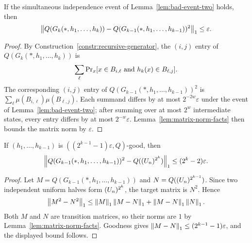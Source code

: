 \begin{lemma}
  \label{lem:induction-matrix-comparison}
  If the simultaneous independence event of Lemma~\ref{lem:bad-event-two}
  holds, then
  \[
    \left\|Q(G_k(*,h_1,\ldots,h_k))
      -Q(G_{k-1}(*,h_1,\ldots,h_{k-1}))^2\right\|_1\le \varepsilon.
  \]
\end{lemma}
\begin{proof}
  By Construction~\ref{constr:recursive-generator}, the $(i,j)$ entry of
  $Q(G_k(*,h_1,\ldots,h_k))$ is
  \[
    \sum_\ell \operatorname{Pr}_x[x\in B_{i,\ell}\text{ and }h_k(x)\in B_{\ell,j}].
  \]
  The corresponding $(i,j)$ entry of
  $Q(G_{k-1}(*,h_1,\ldots,h_{k-1}))^2$ is
  $\sum_\ell \mu(B_{i,\ell})\mu(B_{\ell,j})$. Each summand differs by at most
  $2^{-2w}\varepsilon$ under the event of Lemma~\ref{lem:bad-event-two}; after
  summing over at most $2^w$ intermediate states, every entry differs by at
  most $2^{-w}\varepsilon$. Lemma~\ref{lem:matrix-norm-facts} then bounds the
  matrix norm by $\varepsilon$.
\end{proof}

\begin{lemma}
  \label{lem:induction-square-comparison}
  If $(h_1,\ldots,h_{k-1})$ is
  $((2^{k-1}-1)\varepsilon,Q)$-good, then
  \[
    \left\|Q(G_{k-1}(*,h_1,\ldots,h_{k-1}))^2
      -Q((U_n)^{2^k})\right\|_1
    \le (2^k-2)\varepsilon .
  \]
\end{lemma}
\begin{proof}
  Let $M=Q(G_{k-1}(*,h_1,\ldots,h_{k-1}))$ and
  $N=Q((U_n)^{2^{k-1}})$. Since two independent uniform halves form
  $(U_n)^{2^k}$, the target matrix is $N^2$. Hence
  \[
    \left\|M^2-N^2\right\|_1 \le \left\|M\right\|_1\left\|M-N\right\|_1
       +\left\|M-N\right\|_1\left\|N\right\|_1 .
  \]
  Both $M$ and $N$ are transition matrices, so their norms are $1$ by
  Lemma~\ref{lem:matrix-norm-facts}. Goodness gives
  $\left\|M-N\right\|_1\le(2^{k-1}-1)\varepsilon$, and the displayed bound follows.
\end{proof}


